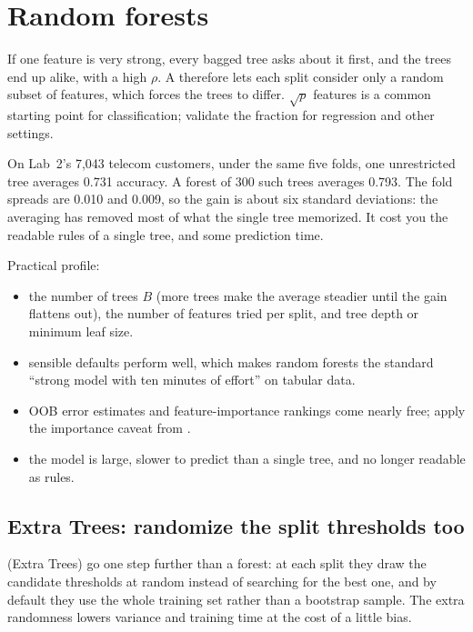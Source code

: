 \section{Random forests}
\label{sec:random-forest}

If one feature is very strong, every bagged tree asks about it first, and the trees end up alike, with a high $\rho$. A  therefore lets each split consider only a random subset of features, which forces the trees to differ. $\sqrt p$ features is a common starting point for classification; validate the fraction for regression and other settings.

\begin{workedexample}
On Lab~2's 7,043 telecom customers, under the same five folds, one unrestricted tree averages 0.731 accuracy. A forest of 300 such trees averages 0.793. The fold spreads are 0.010 and 0.009, so the gain is about six standard deviations: the averaging has removed most of what the single tree memorized. It cost you the readable rules of a single tree, and some prediction time.
\end{workedexample}

Practical profile:

\begin{itemize}
  \item {} the number of trees $B$ (more trees make the average steadier until the gain flattens out), the number of features tried per split, and tree depth or minimum leaf size.
  \item {} sensible defaults perform well, which makes random forests the standard ``strong model with ten minutes of effort'' on tabular data.
  \item {} OOB error estimates and feature-importance rankings come nearly free; apply the importance caveat from .
  \item {} the model is large, slower to predict than a single tree, and no longer readable as rules.
\end{itemize}

\subsection{Extra Trees: randomize the split thresholds too}
\label{sec:extra-trees}

 (Extra Trees) go one step further than a forest: at each split they draw the candidate thresholds at random instead of searching for the best one, and by default they use the whole training set rather than a bootstrap sample. The extra randomness lowers variance and training time at the cost of a little bias.

